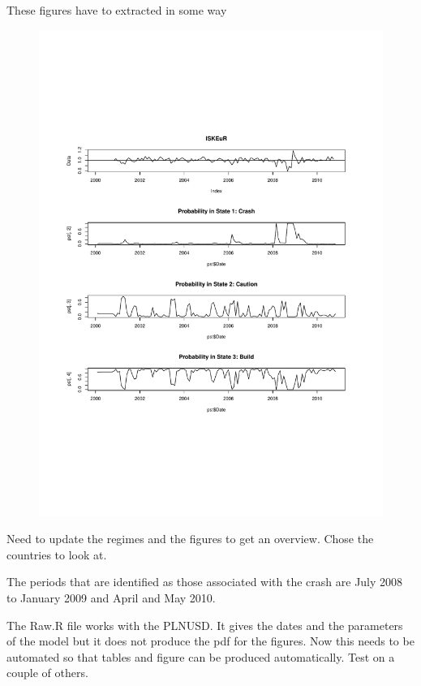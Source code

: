 \documentclass[12pt, a4paper, oneside]{article} %
\begin{document}
These figures have to extracted in some way 

 
\begin{figure}
\centering
\includegraphics[scale = .80]{ISKEUR.pdf}
\end{figure}

Need to update the regimes and the figures to get an overview.  Chose the countries to look at. 

The periods that are identified as those associated with the crash are July 2008 to January 2009 and April and May 2010.  

The Raw.R file works with the PLNUSD.  It gives the dates and the parameters of the model but it does not produce the pdf for the figures. Now this needs to be automated so that tables and figure can be produced automatically. Test on a couple of others. 
\end{document}
